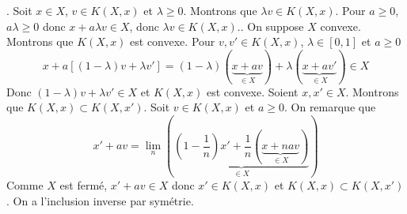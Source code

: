 \documentclass{report}
\begin{document}
\subsection{} \noindent{}\\ 
\\ 
\\
. Soit $x\in X$, $v\in K(X,x)$ et $\lambda\geq 0$. Montrons que $\lambda v\in K(X,x)$. Pour $a\geq 0$, $a\lambda \geq 0$ donc $x+a\lambda v\in X$, donc $\lambda v\in K(X,x)$.\newline {}. On suppose $X$ convexe. Montrons que $K(X,x)$ est convexe. Pour $v,v'\in K(X,x)$, $\lambda\in [0,1]$ et $a\geq 0$ $$x+a[(1-\lambda)v + \lambda v'] = (1-\lambda)(\underbrace{x+av}_{\in X}) + \lambda(\underbrace{x+av'}_{\in X})\in X$$
Donc $(1-\lambda)v + \lambda v'\in X$ et $K(X,x)$ est convexe.\newline \newline
Soient $x,x'\in X$. Montrons que $K(X,x) \subset K(X,x')$. Soit $v\in K(X,x)$ et $a\geq 0$. On remarque que 
$$ x' + av = \lim_n \left( \underbrace{\left( 1-\frac 1n\right)x' + \frac{1}{n}(\underbrace{x+nav}_{\in X})}_{\in X}\right) $$
Comme $X$ est fermé, $x' + av \in X$ donc $x'\in K(X,x)$ et $K(X,x) \subset K(X,x')$.\newline
On a l'inclusion inverse par symétrie.

\subsection{} \noindent\fbox{
\parbox{\linewidth}{

}}\\ 
\\ 
\\
\noindent
\end{document}
